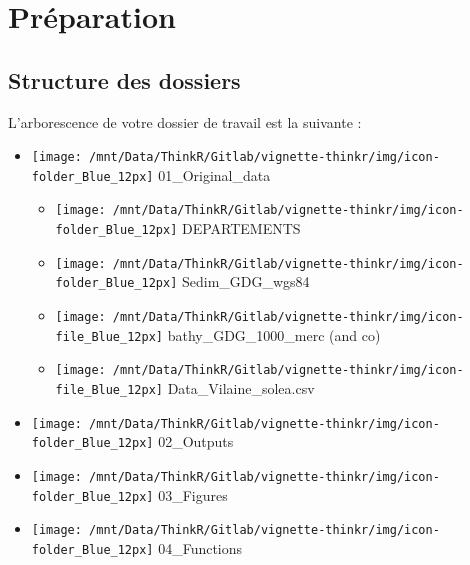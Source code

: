 \documentclass[french,a4paper]{article}
\providecommand{\tightlist}{%
  \setlength{\itemsep}{0pt}\setlength{\parskip}{0pt}}
\begin{document}


\hypertarget{preparation}{%
\section{Préparation}\label{preparation}}

\hypertarget{structure-des-dossiers}{%
\subsection{Structure des dossiers}\label{structure-des-dossiers}}


L'arborescence de votre dossier de travail est la suivante :

\begin{itemize}
\tightlist
\item
  \texttt{[image: /mnt/Data/ThinkR/Gitlab/vignette-thinkr/img/icon-folder\_Blue\_12px]}
  01\_Original\_data

  \begin{itemize}
  \tightlist
  \item
    \texttt{[image: /mnt/Data/ThinkR/Gitlab/vignette-thinkr/img/icon-folder\_Blue\_12px]}
    DEPARTEMENTS
  \item
    \texttt{[image: /mnt/Data/ThinkR/Gitlab/vignette-thinkr/img/icon-folder\_Blue\_12px]}
    Sedim\_GDG\_wgs84
  \item
    \texttt{[image: /mnt/Data/ThinkR/Gitlab/vignette-thinkr/img/icon-file\_Blue\_12px]}
    bathy\_GDG\_1000\_merc (and co)
  \item
    \texttt{[image: /mnt/Data/ThinkR/Gitlab/vignette-thinkr/img/icon-file\_Blue\_12px]}
    Data\_Vilaine\_solea.csv
  \end{itemize}
\item
  \texttt{[image: /mnt/Data/ThinkR/Gitlab/vignette-thinkr/img/icon-folder\_Blue\_12px]}
  02\_Outputs
\item
  \texttt{[image: /mnt/Data/ThinkR/Gitlab/vignette-thinkr/img/icon-folder\_Blue\_12px]}
  03\_Figures
\item
  \texttt{[image: /mnt/Data/ThinkR/Gitlab/vignette-thinkr/img/icon-folder\_Blue\_12px]}
  04\_Functions
\end{itemize}
\end{document}
